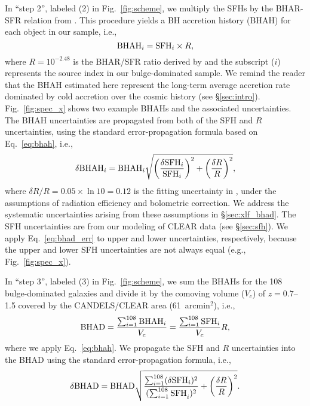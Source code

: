 \documentclass[twocolumn,twocolappendix,times]{aastex63}
\newcommand{\fst}[1]{#1}
\begin{document}
\begin{CJK*}{UTF8}{gbsn}
In ``step 2'', labeled (2) in Fig.~\ref{fig:scheme}, we multiply the SFHs by the BHAR-SFR relation from \citet{yang19}. 
\fst{This procedure yields a BH accretion history (BHAH) for each object in our sample, i.e., 
\begin{equation}
\label{eq:bhah}
{\rm BHAH}_i = {\rm SFH}_i \times R,
\end{equation}
where $R=10^{-2.48}$ is the BHAR/SFR ratio derived by \citet[][see their Eq. 6]{yang19} and the subscript ($i$) represents the source index in our bulge-dominated sample.
We remind the reader that the BHAH estimated here represent the long-term average accretion rate dominated by cold accretion over the cosmic history (see \S\ref{sec:intro}).
Fig.~\ref{fig:spec_x} shows two example BHAHs and the associated uncertainties. 
The BHAH uncertainties are propagated from both of the SFH and $R$ uncertainties, using the standard error-propagation formula based on Eq.~\ref{eq:bhah}, i.e., 
\begin{equation}
    \delta {\rm BHAH}_i = {\rm BHAH}_i \sqrt{ 
    \left(\frac{\delta {\rm SFH}_i}{{\rm SFH}_i}\right)^2 +
    \left(\frac{\delta R}{R}\right)^2},
\end{equation}
where $\delta R/R= 0.05 \times \ln 10=0.12$ is the fitting uncertainty in \citep{yang19}, under the assumptions of radiation efficiency and bolometric correction. 
We address the systematic uncertainties arising from these assumptions in \S\ref{sec:xlf_bhad}.   
The SFH uncertainties are from our modeling of CLEAR data (see \S\ref{sec:sfh}).
We apply Eq.~\ref{eq:bhad_err} to upper and lower uncertainties, respectively, because the upper and lower SFH uncertainties are not always equal (e.g., Fig.~\ref{fig:spec_x}). 
}

In ``step 3'', labeled (3) in Fig.~\ref{fig:scheme}, we sum the BHAHs for the 108 bulge-dominated galaxies and divide it by the comoving volume ($V_c$) of $z=0.7$--1.5 covered by the CANDELS/CLEAR area (61~arcmin$^2$), 
\fst{i.e.,
\begin{equation}
\label{eq:bhad}
    {\rm BHAD} = \frac{\sum_{i=1}^{108}{\rm BHAH}_i}{V_c} \\
               = \frac{\sum_{i=1}^{108}{\rm SFH}_i}{V_c} R,
\end{equation}
where we apply Eq.~\ref{eq:bhah}.
We propagate the SFH and $R$ uncertainties into the BHAD using the standard error-propagation formula, i.e., 
\begin{equation}
\label{eq:bhad_err}
    \delta {\rm BHAD} = {\rm BHAD} 
    \sqrt{ 
    \frac{\sum_{i=1}^{108} (\delta {\rm SFH}_i)^2}
         {({\sum_{i=1}^{108} \rm SFH}_i)^2} +
    \left(\frac{\delta R}{R}\right)^2
    }.
\end{equation}
} 


\end{CJK*}
\end{document}
